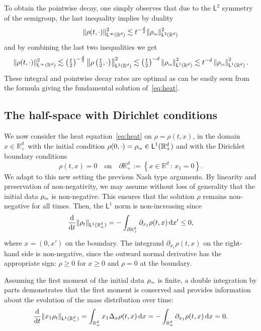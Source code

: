 \documentclass[11pt]{amsart}
\theoremstyle{definition}
\theoremstyle{remark}
\numberwithin{equation}{section}
\newcommand\R{{\mathbb R}}
\newcommand{\dd}{{\, \mathrm d}}
\newcommand{\dt}{\frac{{\rm d}}{{\rm d}t}}
\newcommand{\init}{\text{{\tiny {\rm in}}}}
\newcommand{\sfL}{\mathsf{L}}
\begin{document}
To obtain the pointwise decay, one simply observes that due to the $\sfL^2$ symmetry of the semigroup, the last inequality implies by duality
\begin{equation*}
  \| \rho(t,\cdot) \|_{\sfL^{\infty}(\R^d)}^2 \lesssim t^{-\frac{d}2} \| \rho_{\init} \|_{\sfL^{2}(\R^d)}^2
\end{equation*}
and by combining the last two inequalities we get
\begin{equation*}
  \| \rho(t,\cdot) \|_{\sfL^{\infty}(\R^d)}^2 \lesssim \left(\tfrac{t}{2}\right)^{-\frac{d}2} \left\| \rho\left(\tfrac{t}{2}, \cdot\right) \right\|_{\sfL^{2}(\R^d)}^2 \lesssim \left(\tfrac{t}{2}\right)^{-d} \left\| \rho_\init \right\|_{\sfL^{1}(\R^d)}^2 \lesssim t^{-d} \left\| \rho_\init \right\|_{\sfL^{1}(\R^d)}^2.
\end{equation*}
These integral and pointwise decay rates are optimal as can be easily seen from the formula giving the fundamental solution of~\eqref{eq:heat}.

\subsection{The half-space with Dirichlet conditions}

We now consider the heat equation~\eqref{eq:heat} on $\rho=\rho(t,x)$, in the domain $x \in \R_+^d$ with the initial condition $\rho(0,\cdot)=\rho_\init \in \sfL^{1}(\R_+^d)$ and with the Dirichlet boundary conditions
\begin{equation*}
  \rho(t,x)=0 \quad \mbox{on} \quad \partial \R_+^d := \left\{ x \in \R^d \, : \, x_1=0 \right\}.
\end{equation*}
We adapt to this new setting the previous Nash type arguments. By linearity and preservation of non-negativity, we may assume without loss of generality that the initial data $\rho_\init$ is non-negative. This ensures that the solution $\rho$ remains non-negative for all times. Then, the $\sfL^{1}$ norm is non-increasing since
\begin{equation*}
  \dt \| \rho_t \|_{\sfL^{1}(\R_+^d)} = - \int_{\partial \R_+^d} \partial_{x_1} \rho(t,x) \dd x' \le 0,
\end{equation*}
where $x = (0,x')$ on the boundary. The integrand $\partial_{x_1} \rho(t,x)$ on the right-hand side is non-negative, since the outward normal derivative has the appropriate sign: $\rho \ge 0$ for $x \ge 0$ and $\rho = 0$ at the boundary.

Assuming the first moment of the initial data $\rho_\init$ is finite, a double integration by parts demonstrates that the first moment is conserved and provides information about the evolution of the mass distribution over time:
\begin{equation*}
  \dt \| x_1\rho_t \|_{\sfL^{1}(\R_+^d)} = \int_{\R_+^d} x_1 \Delta_x \rho(t,x) \dd x = - \int_{\R_+^d} \partial_{x_1} \rho(t,x) \dd x =0.
\end{equation*}
\end{document}
